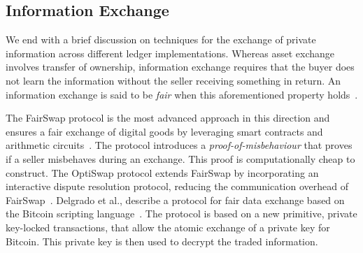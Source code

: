 \subsection{Information Exchange}
We end with a brief discussion on techniques for the exchange of private information across different ledger implementations.
Whereas asset exchange involves transfer of ownership, information exchange requires that the buyer does not learn the information without the seller receiving something in return.
An information exchange is said to be \emph{fair} when this aforementioned property holds~\cite{asokan1997optimistic}.

The FairSwap protocol is the most advanced approach in this direction and ensures a fair exchange of digital goods by leveraging smart contracts and arithmetic circuits~\cite{dziembowski2018fairswap}.
The protocol introduces a \emph{proof-of-misbehaviour} that proves if a seller misbehaves during an exchange.
This proof is computationally cheap to construct.
The OptiSwap protocol extends FairSwap by incorporating an interactive dispute resolution protocol, reducing the communication overhead of FairSwap~\cite{eckey2020optiswap}.
Delgrado et al., describe a protocol for fair data exchange based on the Bitcoin scripting language~\cite{delgado2020fair}.
The protocol is based on a new primitive, private key-locked transactions, that allow the atomic exchange of a private key for Bitcoin.
This private key is then used to decrypt the traded information.

